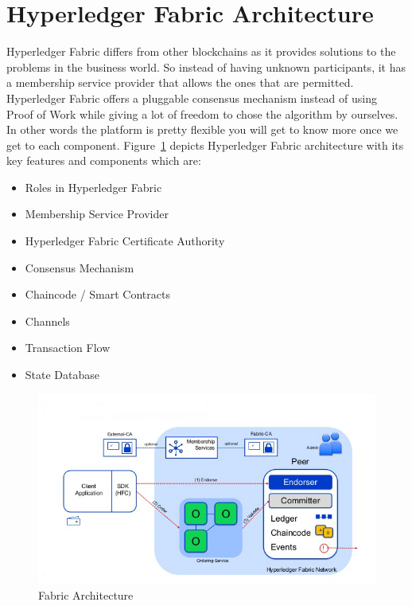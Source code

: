 \section{Hyperledger Fabric Architecture}
Hyperledger Fabric differs from other blockchains as it provides solutions to the problems in the business world. So instead of having unknown participants, it has a membership service provider that allows the ones that are permitted. Hyperledger Fabric offers a pluggable consensus mechanism instead of using Proof of Work while giving a lot of freedom to chose the algorithm by ourselves. In other words the platform is pretty flexible you will get to know more once we get to each component. Figure~\ref{fig:fabric_arch} depicts Hyperledger Fabric architecture with its key features and components which are:
\begin{itemize}
    \item Roles in Hyperledger Fabric
     \item Membership Service Provider
     \item Hyperledger Fabric Certificate Authority
    \item Consensus Mechanism
    \item Chaincode / Smart Contracts 
    \item Channels
    \item Transaction Flow
    \item State Database
\end{itemize}
\begin{figure}[!htb]
    \centering
    \includegraphics[width=1\textwidth]{figures/HyperledgerArchitecture.jpg}
    \caption{Fabric Architecture}
    \label{fig:fabric_arch}
\end{figure}

